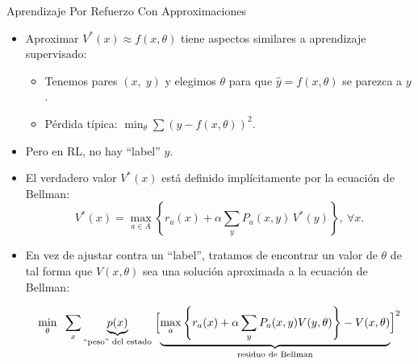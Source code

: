 \documentclass[handout]{beamer}
\begin{document}
\begin{frame}{Aprendizaje Por Refuerzo Con Approximaciones}

\begin{itemize}
\item Aproximar $V^*(x) \approx f(x,\theta)$ tiene aspectos similares a aprendizaje supervisado:
\begin{itemize}
\item<2-> Tenemos pares \((x,\; y)\) y elegimos $\theta$ para que \(\hat y = f(x,\theta)\) se parezca a \(y\).  
\item<3-> Pérdida típica: \(\displaystyle\min_\theta \sum (y - f(x,\theta))^2\).
\end{itemize}
\item<4-> Pero  en RL, no hay “label” \(y\).
\item<5-> El verdadero valor $V^*(x)$ está definido implícitamente por la ecuación de Bellman:
\[
     V^*(x)=\max\limits_{a \in A}
     \left\{r_a(x)+\alpha\sum_y P_a(x,y)\,V^*(y)\right\},~\forall x.
\]
\item<6-> En vez de ajustar contra un “label”, tratamos de encontrar un valor de $\theta$ de tal forma que \(V(x,\theta)\) sea una solución aproximada a la ecuación de Bellman:  
\begin{small}
  \[
     \min_\theta \;\;\sum_x
     \underbrace{p(x)}_{\text{“peso” del estado}}\;
     \Bigl[\underbrace{\max_a\left\{r_a(x)+\alpha\sum_y P_a(x,y)V(y,\theta)\right\}-V(x,\theta)}_{\text{residuo de Bellman}}\Bigr]^2
  \]
  \end{small}
\end{itemize}
\end{frame}
\end{document}
